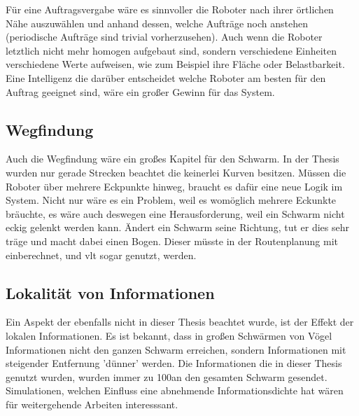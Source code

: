Für eine Auftragsvergabe wäre es sinnvoller die Roboter nach ihrer örtlichen Nähe auszuwählen und anhand dessen, welche Aufträge noch anstehen (periodische Aufträge sind trivial vorherzusehen). Auch wenn die Roboter letztlich nicht mehr homogen aufgebaut sind, sondern verschiedene Einheiten verschiedene Werte aufweisen, wie zum Beispiel ihre Fläche oder Belastbarkeit. Eine Intelligenz die darüber entscheidet welche Roboter am besten für den Auftrag geeignet sind, wäre ein großer Gewinn für das System.

\subsection*{Wegfindung}

Auch die Wegfindung wäre ein großes Kapitel für den Schwarm. In der Thesis wurden nur gerade Strecken beachtet die keinerlei Kurven besitzen. Müssen die Roboter über mehrere Eckpunkte hinweg, braucht es dafür eine neue Logik im System. Nicht nur wäre es ein Problem, weil es womöglich mehrere Eckunkte bräuchte, es wäre auch deswegen eine Herausforderung, weil ein Schwarm nicht eckig gelenkt werden kann. Ändert ein Schwarm seine Richtung, tut er dies sehr träge und macht dabei einen Bogen. Dieser müsste in der Routenplanung mit einberechnet, und vlt sogar genutzt, werden.

\subsection*{Lokalität von Informationen}

Ein Aspekt der ebenfalls nicht in dieser Thesis beachtet wurde, ist der Effekt der lokalen Informationen. Es ist bekannt, dass in großen Schwärmen von Vögel Informationen nicht den ganzen Schwarm erreichen, sondern Informationen mit steigender Entfernung 'dünner' werden\cite{LocalInformation}. Die Informationen die in dieser Thesis genutzt wurden, wurden immer zu 100\per an den gesamten Schwarm gesendet. Simulationen, welchen Einfluss eine abnehmende Informationsdichte hat wären für weitergehende Arbeiten interesssant.